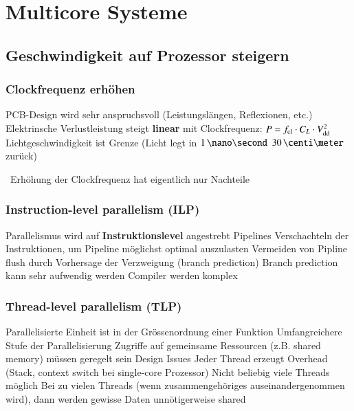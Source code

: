 \section{Multicore Systeme}

\subsection{Geschwindigkeit auf Prozessor steigern}

\subsubsection{Clockfrequenz erhöhen}

\begin{outline}
    \1 PCB-Design wird sehr anspruchsvoll (Leistungslängen, Reflexionen, etc.)
    \1 Elektrinsche Verlustleistung steigt \textbf{linear} mit Clockfrequenz: $P = f_{\rm cl} \cdot C_L \cdot V_{\rm dd}^2$
    \1 Lichtgeschwindigkeit ist Grenze (Licht legt in $1 \, \nano \second$ $30 \, \centi \meter$ zurück)
\end{outline}

\vspace{0.1cm}

\textrightarrow\ Erhöhung der Clockfrequenz hat eigentlich nur Nachteile


\subsubsection{Instruction-level parallelism (ILP)}

\begin{outline}
    \1 Parallelismus wird auf \textbf{Instruktionslevel} angestrebt
        \2 Pipelines
        \2 Verschachteln der Instruktionen, um Pipeline möglichst optimal auszulasten
        \2 Vermeiden von Pipline flush durch Vorhersage der Verzweigung (branch prediction)
    \1[-] Branch prediction kann sehr aufwendig werden
    \1[-] Compiler werden komplex
\end{outline}


\subsubsection{Thread-level parallelism (TLP)}

\begin{outline}
    \1 Parallelisierte Einheit ist in der Grössenordnung einer Funktion
        \2 Umfangreichere Stufe der Parallelisierung
    \1 Zugriffe auf gemeinsame Ressourcen (z.B. shared memory) müssen geregelt sein
    \1 Design Issues
        \2 Jeder Thread erzeugt Overhead (Stack, context switch bei single-core Prozessor)
        \2 Nicht beliebig viele Threads möglich
        \2 Bei zu vielen Threads (wenn zusammengehöriges auseinandergenommen wird), dann werden
            gewisse Daten unnötigerweise shared
\end{outline}


